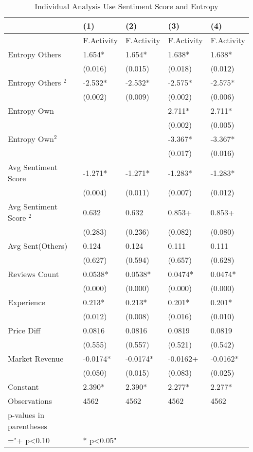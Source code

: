 \begin{table}[]
\centering
\begin{tabular}{@{}lllll@{}}
\toprule
 & (1) & (2) & (3) & (4) \\ \midrule
 & F.Activity & F.Activity & F.Activity & F.Activity \\
Entropy Others & 1.654* & 1.654* & 1.638* & 1.638* \\
 & (0.016) & (0.015) & (0.018) & (0.012) \\
Entropy Others $^2$ & -2.532* & -2.532* & -2.575* & -2.575* \\
 & (0.002) & (0.009) & (0.002) & (0.006) \\
Entropy Own &  &  & 2.711* & 2.711* \\
 &  &  & (0.002) & (0.005) \\
Entropy Own$^2$&  &  & -3.367* & -3.367* \\
 &  &  & (0.017) & (0.016) \\
Avg Sentiment Score & -1.271* & -1.271* & -1.283* & -1.283* \\
 & (0.004) & (0.011) & (0.007) & (0.012) \\
Avg Sentiment Score $^2$ & 0.632 & 0.632 & 0.853+ & 0.853+ \\
 & (0.283) & (0.236) & (0.082) & (0.080) \\
Avg Sent(Others) & 0.124 & 0.124 & 0.111 & 0.111 \\
 & (0.627) & (0.594) & (0.657) & (0.628) \\
Reviews Count & 0.0538* & 0.0538* & 0.0474* & 0.0474* \\
 & (0.000) & (0.000) & (0.000) & (0.000) \\
Experience & 0.213* & 0.213* & 0.201* & 0.201* \\
 & (0.012) & (0.008) & (0.016) & (0.010) \\
Price Diff & 0.0816 & 0.0816 & 0.0819 & 0.0819 \\
 & (0.555) & (0.557) & (0.521) & (0.542) \\
Market Revenue & -0.0174* & -0.0174* & -0.0162+ & -0.0162* \\
 & (0.050) & (0.015) & (0.083) & (0.025) \\
Constant & 2.390* & 2.390* & 2.277* & 2.277* \\
Observations & 4562 & 4562 & 4562 & 4562 \\
p-values in parentheses &  &  &  &  \\
="+ p\textless{}0.10 & * p\textless{}0.05" &  &  &  \\ \bottomrule
\end{tabular}
\caption{Individual Analysis Use Sentiment Score and Entropy}
\label{reg_ind_3}
\end{table}